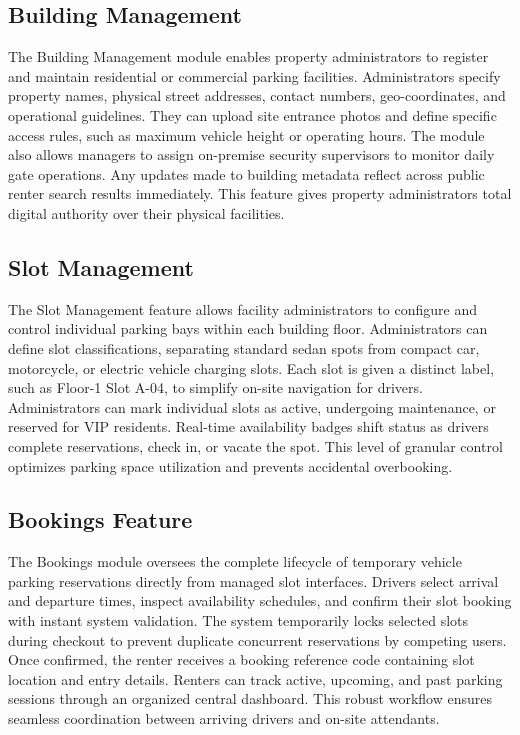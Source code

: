 \documentclass[12pt,a4paper]{article}
\begin{document}
\subsection{Building Management}
The Building Management module enables property administrators to register and maintain residential or commercial parking facilities. Administrators specify property names, physical street addresses, contact numbers, geo-coordinates, and operational guidelines. They can upload site entrance photos and define specific access rules, such as maximum vehicle height or operating hours. The module also allows managers to assign on-premise security supervisors to monitor daily gate operations. Any updates made to building metadata reflect across public renter search results immediately. This feature gives property administrators total digital authority over their physical facilities.

\subsection{Slot Management}
The Slot Management feature allows facility administrators to configure and control individual parking bays within each building floor. Administrators can define slot classifications, separating standard sedan spots from compact car, motorcycle, or electric vehicle charging slots. Each slot is given a distinct label, such as Floor-1 Slot A-04, to simplify on-site navigation for drivers. Administrators can mark individual slots as active, undergoing maintenance, or reserved for VIP residents. Real-time availability badges shift status as drivers complete reservations, check in, or vacate the spot. This level of granular control optimizes parking space utilization and prevents accidental overbooking.

\subsection{Bookings Feature}
The Bookings module oversees the complete lifecycle of temporary vehicle parking reservations directly from managed slot interfaces. Drivers select arrival and departure times, inspect availability schedules, and confirm their slot booking with instant system validation. The system temporarily locks selected slots during checkout to prevent duplicate concurrent reservations by competing users. Once confirmed, the renter receives a booking reference code containing slot location and entry details. Renters can track active, upcoming, and past parking sessions through an organized central dashboard. This robust workflow ensures seamless coordination between arriving drivers and on-site attendants.
\end{document}

